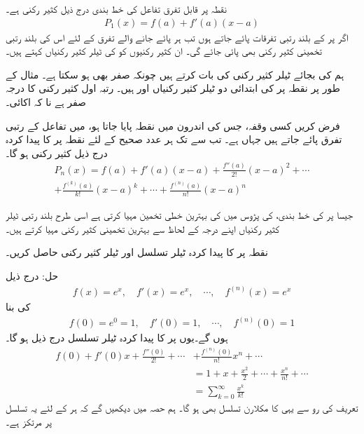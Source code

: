 نقطہ  پر قابل تفرق تفاعل  کی خط بندی درج ذیل کثیر رکنی ہے۔
\begin{align*}
P_1(x)=f(a)+f'(a)(x-a)
\end{align*} 
اگر  پر  کے بلند رتبی تفرقات پائے جاتے ہوں تب ہر پائے جانے والے تفرق کے لئے  اس کی بلند رتبی تخمینی کثیر رکنی بھی پائی جائے گی۔  ان کثیر رکنیوں کو  کی ٹیلر کثیر رکنیاں کہتے ہیں۔

ہم   کی بجائے   ٹیلر کثیر رکنی کی بات کرتے ہیں چونکہ  صفر بھی ہو سکتا ہے۔ مثال کے طور پر نقطہ  پر  کی ابتدائی دو ٹیلر کثیر رکنیاں  اور  ہیں۔ رتبہ اول کثیر رکنی کا درجہ صفر ہے نا کہ اکائی۔

فرض کریں کسی وقفہ، جس کی اندرون میں نقطہ  پایا جاتا ہو، میں تفاعل  کے  رتبی تفرق پائے جاتے ہیں جہاں  ہے۔ تب  سے  تک ہر عدد صحیح کے لئے نقطہ  پر  کا پیدا کردہ  درج ذیل کثیر رکنی ہو گا۔
\begin{multline*}
P_n(x)=f(a)+f'(a)(x-a)+\frac{f''(a)}{2!}(x-a)^2+\cdots\\
+\frac{f^{(k)}(a)}{k!}(x-a)^k+\cdots+\frac{f^{(n)}(a)}{n!}(x-a)^n
\end{multline*}

جیسا  پر  کی خط بندی،  کی پڑوس میں  کی  بہترین خطی تخمین مہیا کرتی ہے اسی طرح بلند رتبی ٹیلر کثیر رکنیاں اپنے درجہ کے لحاظ سے بہترین تخمینی کثیر رکنی مہیا کرتے ہیں۔

نقطہ  پر  کا پیدا کردہ ٹیلر تسلسل اور ٹیلر کثیر رکنی حاصل کریں۔

حل:\quad
درج ذیل
\begin{align*}
f(x)=e^x,\quad f'(x)=e^x,\quad \cdots, \quad f^{(n)}(x)=e^x
\end{align*}
کی بنا  
\begin{align*}
f(0)=e^0=1,\quad f'(0)=1,\quad \cdots, \quad f^{(n)}(0)=1
\end{align*}
ہوں گے۔یوں  پر  کا پیدا کردہ ٹیلر تسلسل درج ذیل ہو گا۔
\begin{align*}
f(0)+f'(0)x+\frac{f''(0)}{2!}+\cdots &+\frac{f^{(n)}(0)}{n!}x^n+\cdots\\
&=1+x+\frac{x^2}{2}+\cdots+\frac{x^n}{n!}+\cdots\\
&=\sum_{k=0}^{\infty}\frac{x^k}{k!}
\end{align*}
تعریف کی رو سے یہی  کا مکلارن تسلسل بھی ہو گا۔ ہم حصہ میں دیکھیں گے کہ ہر  کے لئے یہ تسلسل  پر مرتکز ہے۔ 


